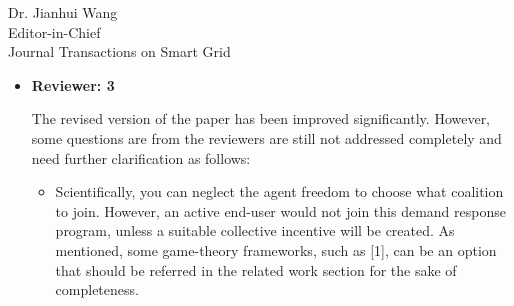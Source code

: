 \documentclass{letter}
\begin{document}
\begin{letter}{Dr. Jianhui Wang \\ Editor-in-Chief \\ Journal Transactions on Smart Grid }
\begin{itemize}
\begin{itemize}
		\item The last sentence of Section VI-A is confusing.
		
		\textbf{Answer :} We removed this sentence from the paper.

		\item The numerical setup used to generate Fig. 5 needs to be explained.
		
		\textbf{Answer :} We added information in the caption of figure 5. The histograms show utility values for triplets (triangles of decorrelation graph in red, other triplets in blue). The total number of prosumer is $N=200$. $ \phi = 0.1 $, $ \bar{\mu} = 3.9 $MW, $ \bar{\sigma} = 1.9 $MW, $ \bar{\rho} = 0.69 $, $\alpha^{\star} = 0.08 $. 

		\item Are the clusters produced by the algorithms in Section VI sensitive to the selected parameters $ N_{COAL} $ and k?
		
		\textbf{Answer :} The clusters are sensible to $ N_{COAL} $ (number of coalitions).

		\item The numerical setup for Fig. 6 must be explained. In particular, how are real data mapped to the quantities of eq. (14)?
		
		\textbf{Answer :} We added information in the caption of figure 6. The total number of prosumer is $N=200$, $ \phi = 0.1 $, $ \bar{\mu} = 3.9 $MW, $ \bar{\sigma} = 1.9 $MW, $ \bar{\rho} = 0.69 $. On this figure, we show an example where $ \bar{N} = 40 $, such that $ \alpha^{\star} = 0.006$ from eq. 14.


	\end{itemize}

	\item \textbf{Reviewer: 3}
	
The revised version of the paper has been improved significantly. However, some questions are from the reviewers are still not addressed completely and need further clarification as follows:

	\begin{itemize}
	
		\item Scientifically, you can neglect the agent freedom to choose what coalition to join. However, an active end-user would not join this demand response program, unless a suitable collective incentive will be created. As mentioned, some game-theory frameworks, such as [1], can be an option that should be referred in the related work section for the sake of completeness.


\end{itemize}
\end{itemize}
\end{letter}
\end{document}
